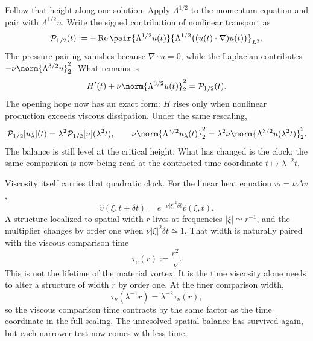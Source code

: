 
Follow that height along one solution. Apply \(\Lambda^{1/2}\) to the momentum equation and pair with \(\Lambda^{1/2}u\). Write the signed contribution of nonlinear transport as
\[
  \mathcal P_{1/2}(t)
  :=
  -\operatorname{Re}
  \pair
    {\Lambda^{1/2}u(t)}
    {\Lambda^{1/2}\bigl((u(t)\cdot\nabla)u(t)\bigr)}_{L^2}.
\]
The pressure pairing vanishes because \(\nabla\cdot u=0\), while the Laplacian contributes \(-\nu\norm{\Lambda^{3/2}u}_2^2\). What remains is
\[
  H'(t)
  +
  \nu\norm{\Lambda^{3/2}u(t)}_2^2
  =
  \mathcal P_{1/2}(t).
\]
The opening hope now has an exact form: \(H\) rises only when nonlinear production exceeds viscous dissipation. Under the same rescaling,
\[
  \mathcal P_{1/2}[u_\lambda](t)
  =
  \lambda^2\mathcal P_{1/2}[u](\lambda^2t),
  \qquad
  \nu\norm{\Lambda^{3/2}u_\lambda(t)}_2^2
  =
  \lambda^2\nu\norm{\Lambda^{3/2}u(\lambda^2t)}_2^2.
\]
The balance is still level at the critical height. What has changed is the clock: the same comparison is now being read at the contracted time coordinate \(t\mapsto\lambda^{-2}t\).


Viscosity itself carries that quadratic clock. For the linear heat equation \(v_t=\nu\Delta v\),
\[
  \widehat v(\xi,t+\delta t)
  =
  e^{-\nu|\xi|^2\delta t}\widehat v(\xi,t).
\]
A structure localized to spatial width \(r\) lives at frequencies \(|\xi|\simeq r^{-1}\), and the multiplier changes by order one when \(\nu|\xi|^2\delta t\simeq1\). That width is naturally paired with the viscous comparison time
\[
  \tau_\nu(r)
  :=
  \frac{r^2}{\nu}.
\]
This is not the lifetime of the material vortex. It is the time viscosity alone needs to alter a structure of width \(r\) by order one. At the finer comparison width,
\[
  \tau_\nu(\lambda^{-1}r)
  =
  \lambda^{-2}\tau_\nu(r),
\]
so the viscous comparison time contracts by the same factor as the time coordinate in the full \NavierStokes{} scaling. The unresolved spatial balance has survived again, but each narrower test now comes with less time.


